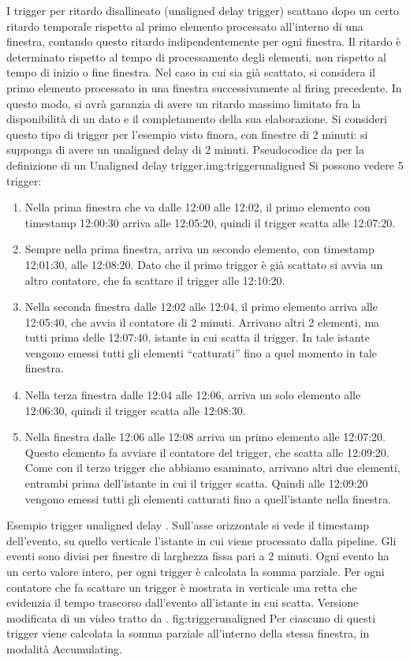 I trigger per ritardo disallineato (unaligned delay trigger) scattano dopo un certo ritardo temporale rispetto al primo elemento processato all’interno di una finestra, contando questo ritardo indipendentemente per ogni finestra. Il ritardo è determinato rispetto al tempo di processamento degli elementi, non rispetto al tempo di inizio o fine finestra. Nel caso in cui sia già scattato, si considera il primo elemento processato in una finestra successivamente al firing precedente. In questo modo, si avrà garanzia di avere un ritardo massimo limitato fra la disponibilità di un dato e il completamento della sua elaborazione.
Si consideri questo tipo di trigger per l’esempio visto finora, con finestre di 2 minuti: si supponga di avere un unaligned delay di 2 minuti.
{Pseudocodice da \cite{akidauchernyaklax} per la definizione di un Unaligned delay trigger.}{img:triggerunaligned}
Si possono vedere 5 trigger:
\begin{enumerate}
\item Nella prima finestra che va dalle 12:00 alle 12:02, il primo elemento con timestamp 12:00:30 arriva alle 12:05:20, quindi il trigger scatta alle 12:07:20.
\item Sempre nella prima finestra, arriva un secondo elemento, con timestamp 12:01:30, alle 12:08:20. Dato che il primo trigger è già scattato si avvia un altro contatore, che fa scattare il trigger alle 12:10:20.
\item Nella seconda finestra dalle 12:02 alle 12:04, il primo elemento arriva alle 12:05:40, che avvia il contatore di 2 minuti. Arrivano altri 2 elementi, ma tutti prima delle 12:07:40, istante in cui scatta il trigger. In tale istante vengono emessi tutti gli elementi “catturati” fino a quel momento in tale finestra.
\item Nella terza finestra dalle 12:04 alle 12:06, arriva un solo elemento alle 12:06:30, quindi il trigger scatta alle 12:08:30.
\item Nella finestra dalle 12:06 alle 12:08 arriva un primo elemento alle 12:07:20. Questo elemento fa avviare il contatore del trigger, che scatta alle 12:09:20. Come con il terzo trigger che abbiamo esaminato, arrivano altri due elementi, entrambi prima dell’istante in cui il trigger scatta. Quindi alle 12:09:20 vengono emessi tutti gli elementi catturati fino a quell’istante nella finestra.
\end{enumerate}
{Esempio trigger unaligned delay \cite{akidauchernyaklax}. Sull'asse orizzontale si vede il timestamp dell'evento, su quello verticale l'istante in cui viene processato dalla pipeline. Gli eventi sono divisi per finestre di larghezza fissa pari a 2 minuti. Ogni evento ha un certo valore intero, per ogni trigger è calcolata la somma parziale. Per ogni contatore che fa scattare un trigger è mostrata in verticale una retta che evidenzia il tempo trascorso dall'evento all'istante in cui scatta. Versione modificata di un video tratto da  \cite{akidau_chernyak_lax_2018}. } 
{fig:triggerunaligned}
Per ciascuno di questi trigger viene calcolata la somma parziale all'interno della stessa finestra, in modalità Accumulating.

